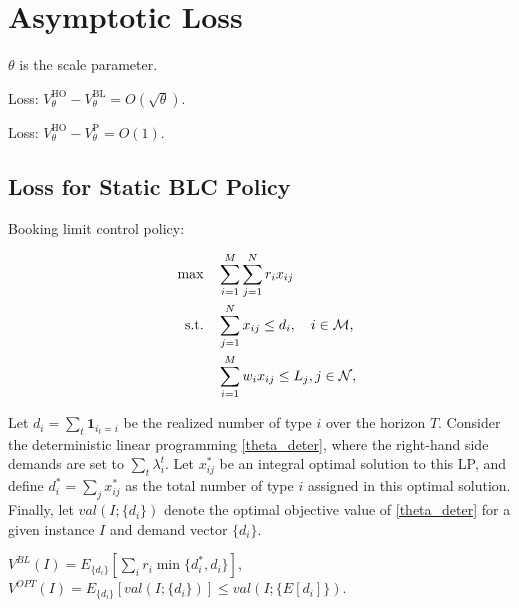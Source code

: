 \section{Asymptotic Loss}


$\theta$ is the scale parameter.

\begin{prop}
    Loss: $V_{\theta}^{\text{HO}} - V_{\theta}^{\text{BL}} = O(\sqrt{\theta})$. 
\end{prop}

\begin{prop}
    Loss: $V_{\theta}^{\text{HO}} - V_{\theta}^{\text{P}} = O(1)$. 
\end{prop}



\subsection{Loss for Static BLC Policy}
Booking limit control policy:

\begin{align}
    \quad \max \quad & \sum_{i=1}^{M}  \sum_{j= 1}^{N} r_{i} x_{ij} \label{theta_deter} \\
    \text {s.t.} \quad & \sum_{j= 1}^{N} x_{ij} \leq d_{i}, \quad i \in \mathcal{M}, \notag \\ 
    & \sum_{i=1}^{M} w_{i} x_{ij} \leq L_j, j \in \mathcal{N}, \notag 
\end{align}


Let $d_{i} =\sum_{t} \bm{1}_{i_{t} = i}$ be the realized number of type $i$ over the horizon $T$. 
Consider the deterministic linear programming \eqref{theta_deter}, where the right-hand side demands are set to $\sum_{t} \lambda_{i}^{t}$. Let $x_{ij}^{*}$ be an integral optimal solution to this LP, and define $d_{i}^{*} = \sum_{j} x_{ij}^{*}$ as the total number of type $i$ assigned in this optimal solution. Finally, let $val(I; \{d_{i}\})$ denote the optimal objective value of \eqref{theta_deter} for a given instance $I$ and demand vector $\{d_{i}\}$.

$V^{BL}(I) = E_{\{d_{i}\}}[\sum_{i} r_{i} \min\{d_{i}^{*}, d_{i}\}]$, $V^{OPT}(I) = E_{\{d_{i}\}} [val(I; \{d_{i}\})] \leq val(I; \{E[d_{i}]\})$.

